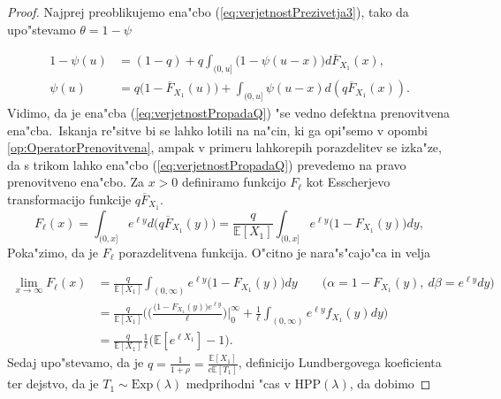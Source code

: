 \documentclass[12pt, a4paper, reqno]{amsart}
\theoremstyle{definition}
\theoremstyle{plain}
\newcommand{\E}{\mathbb{E}}
\newcommand{\1}{\mathds{1}}
\begin{document}
            \begin{proof} 
                Najprej preoblikujemo ena"cbo (\ref{eq:verjetnostPrezivetja3}), tako da 
                upo"stevamo $\theta = 1 - \psi$

                \begin{align}
                    1 - \psi(u) &= (1 - q) + q\int_{(0, u]}\bigl(1 - \psi(u - x)\bigr)d\overline{F}_{X_1}(x), \nonumber \\
                    \psi(u) &= q\bigl(1 - \overline{F}_{X_1}(u)\bigr) + \int_{(0, u]}\psi(u - x)d\left(q\overline{F}_{X_1}(x)\right). \label{eq:verjetnostPropadaQ}
                \end{align}
                Vidimo, da je ena"cba (\ref{eq:verjetnostPropadaQ}) "se vedno defektna prenovitvena ena"cba.\ Iskanja re"sitve 
                bi se lahko lotili na na"cin, ki ga opi"semo v opombi \ref{op:OperatorPrenovitvena}, ampak 
                v primeru lahkorepih porazdelitev se izka"ze, da s trikom lahko ena"cbo (\ref{eq:verjetnostPropadaQ}) 
                prevedemo na pravo prenovitveno ena"cbo. Za $x > 0$ 
                definiramo funkcijo $F_\ell$ kot Esscherjevo transformacijo funkcije $q\overline{F}_{X_1}$.
                \begin{equation}
                    F_\ell(x) = \int_{(0, x]}e^{\ell y}d\bigl(q\overline{F}_{X_1}(y)\bigr) = \frac{q}{\E\left[X_1\right]}\int_{(0, x]}e^{\ell y}\bigl(1 - F_{X_1}(y)\bigr)dy, 
                    \label{eq:EsscherjevaTransformacija}
                \end{equation}
                Poka"zimo, da je $F_\ell$ porazdelitvena funkcija. O"citno je nara"s"cajo"ca in velja

                \begin{align*}
                    \lim_{x\to\infty}F_\ell(x) &= \frac{q}{\E\left[X_1\right]}\int_{(0, \infty)}e^{\ell y} \bigl(1 - F_{X_1}(y)\bigr)dy \qquad \bigl(\alpha = 1 - F_{X_1}(y), \ d\beta = e^{\ell y}dy\bigr)\\
                                               &= \frac{q}{\E\left[X_1\right]}\biggl(\biggl(\frac{\bigl(1 - F_{X_1}(y)\bigr)e^{\ell y}}{\ell}\biggr)\Big|_{0}^{\infty} + \frac{1}{\ell}\int_{(0, \infty)}e^{\ell y}f_{X_1}(y)dy\biggr) \\
                                               &= \frac{q}{\E\left[X_1\right]}\frac{1}{\ell}\biggl(\E\left[e^{\ell X_1}\right] - 1\biggr).
                \end{align*}
                Sedaj upo"stevamo, da je $q = \frac{1}{1 + \rho} = \frac{\E\left[X_1\right]}{c\E\left[T_1\right]}$, 
                definicijo Lundbergovega koeficienta ter dejstvo, da je $T_1\sim\text{Exp}(\lambda)$ medprihodni "cas v $\text{HPP}(\lambda)$, da dobimo


\end{proof}
\end{document}
